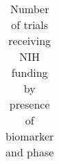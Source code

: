 \begin{table}[htbp]\centering
\caption{Number of trials receiving NIH funding by presence of biomarker and phase}
\begin{tabular}{l*{5}{c}}
\hline\hline



\hline\hline
\end{tabular}
\end{table}
